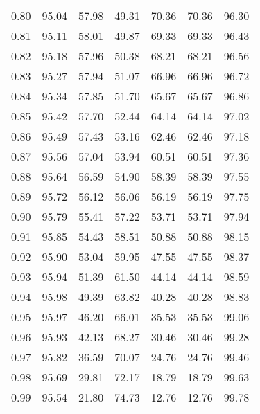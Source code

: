 \begin{tabular}{|c|c|c|c|c|c|c|}
      0.80 &     95.04 &     57.98 &      49.31 &   70.36 &      70.36 &         96.30 \\
      0.81 &     95.11 &     58.01 &      49.87 &   69.33 &      69.33 &         96.43 \\
      0.82 &     95.18 &     57.96 &      50.38 &   68.21 &      68.21 &         96.56 \\
      0.83 &     95.27 &     57.94 &      51.07 &   66.96 &      66.96 &         96.72 \\
      0.84 &     95.34 &     57.85 &      51.70 &   65.67 &      65.67 &         96.86 \\
      0.85 &     95.42 &     57.70 &      52.44 &   64.14 &      64.14 &         97.02 \\
      0.86 &     95.49 &     57.43 &      53.16 &   62.46 &      62.46 &         97.18 \\
      0.87 &     95.56 &     57.04 &      53.94 &   60.51 &      60.51 &         97.36 \\
      0.88 &     95.64 &     56.59 &      54.90 &   58.39 &      58.39 &         97.55 \\
      0.89 &     95.72 &     56.12 &      56.06 &   56.19 &      56.19 &         97.75 \\
      0.90 &     95.79 &     55.41 &      57.22 &   53.71 &      53.71 &         97.94 \\
      0.91 &     95.85 &     54.43 &      58.51 &   50.88 &      50.88 &         98.15 \\
      0.92 &     95.90 &     53.04 &      59.95 &   47.55 &      47.55 &         98.37 \\
      0.93 &     95.94 &     51.39 &      61.50 &   44.14 &      44.14 &         98.59 \\
      0.94 &     95.98 &     49.39 &      63.82 &   40.28 &      40.28 &         98.83 \\
      0.95 &     95.97 &     46.20 &      66.01 &   35.53 &      35.53 &         99.06 \\
      0.96 &     95.93 &     42.13 &      68.27 &   30.46 &      30.46 &         99.28 \\
      0.97 &     95.82 &     36.59 &      70.07 &   24.76 &      24.76 &         99.46 \\
      0.98 &     95.69 &     29.81 &      72.17 &   18.79 &      18.79 &         99.63 \\
      0.99 &     95.54 &     21.80 &      74.73 &   12.76 &      12.76 &         99.78 \\
\bottomrule
\end{tabular}
